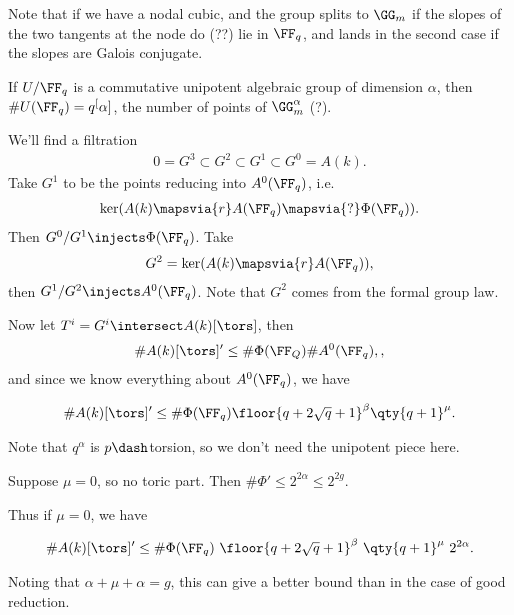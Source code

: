 Note that if we have a nodal cubic, and the group splits to \(\GG_m\) if
the slopes of the two tangents at the node do (??) lie in \(\FF_q\), and
lands in the second case if the slopes are Galois conjugate.

If \(U/\FF_q\) is a commutative unipotent algebraic group of dimension
\(\alpha\), then \(\# U(\FF_q) = q^[\alpha]\), the number of points of
\(\GG_m^\alpha\) (?).

We'll find a filtration
\begin{align*}
0 = G^3 \subset G^2 \subset G^1 \subset G^0 = A(k)
.\end{align*} Take \(G^1\) to be the points reducing into
\(A^0(\FF_q)\), i.e.~
\begin{align*}\ker( A(k) \mapsvia{r} A(\FF_q) \mapsvia{?} \Phi(\FF_q) ).\end{align*}
Then \(G^0 / G^1 \injects \Phi(\FF_q)\). Take
\begin{align*}G^2 = \ker(A(k) \mapsvia{r} A(\FF_q)),\end{align*} then
\(G^1/ G^2 \injects A^0(\FF_q)\). Note that \(G^2\) comes from the
formal group law.

Now let \(T^i = G^i \intersect A(k)[\tors]\), then
\begin{align*}
\# A(k)[\tors]' \leq \# \Phi(\FF_Q) \# A^0(\FF_q),
,\end{align*} and since we know everything about \(A^0(\FF_q)\), we have

\begin{align*}
\#A(k)[\tors]' \leq \# \Phi(\FF_q) \floor{ q + 2\sqrt q + 1  }^\beta \qty{q + 1}^\mu
.\end{align*}

Note that \(q^\alpha\) is \(p\dash\)torsion, so we don't need the
unipotent piece here.

\begin{description}
\tightlist
\item[Theorem (Lestra-Oort)]
Suppose \(\mu = 0\), so no toric part. Then
\(\# \Phi' \leq 2^{2\alpha} \leq 2^{2g}\).
\end{description}

Thus if \(\mu = 0\), we have

\begin{align*}
\#A(k)[\tors]' \leq \# \Phi(\FF_q) ~\floor{ q + 2\sqrt q + 1  }^\beta ~\qty{q + 1}^\mu ~2^{2\alpha}
.\end{align*}

Noting that \(\alpha + \mu + \alpha = g\), this can give a better bound
than in the case of good reduction.

